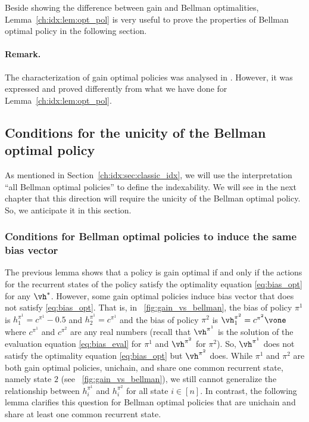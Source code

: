 Beside showing the difference between gain and Bellman optimalities, Lemma~\ref{ch:idx:lem:opt_pol} is very useful to prove the properties of Bellman optimal policy in the following section.

\paragraph{Remark.} The characterization of gain optimal policies was analysed in \cite{puterman2014markov, schweitzer1978functional}.
However, it was expressed and proved differently from what we have done for Lemma~\ref{ch:idx:lem:opt_pol}.

\subsection{Conditions for the unicity of the Bellman optimal policy}
\label{ch:idx:ssec:unicity_bell}

As mentioned in Section~\ref{ch:idx:sec:classic_idx}, we will use the interpretation ``all Bellman optimal policies'' to define the indexability.
We will see in the next chapter that this direction will require the unicity of the Bellman optimal policy.
So, we anticipate it in this section.

\subsubsection{Conditions for Bellman optimal policies to induce the same bias vector}

The previous lemma shows that a policy is gain optimal if and only if the actions for the recurrent states of the policy satisfy the optimality equation \eqref{eq:bias_opt} for any $\vh^*$.
However, some gain optimal policies induce bias vector that does not satisfy \eqref{eq:bias_opt}.
That is, in \figurename~\ref{fig:gain_vs_bellman}, the bias of policy $\pi^1$ is $h^{\pi^1}_1=c^{\pi^1}-0.5$ and $h^{\pi^1}_2=c^{\pi^1}$ and the bias of policy $\pi^2$ is $\vh^{\pi^2}_1=c^{\pi^2}\vone$ where $c^{\pi^1}$ and $c^{\pi^2}$ are any real numbers (recall that $\vh^{\pi^1}$ is the solution of the evaluation equation \eqref{eq:bias_eval} for $\pi^1$ and $\vh^{\pi^2}$ for $\pi^2$).
So, $\vh^{\pi^1}$ does not satisfy the optimality equation \eqref{eq:bias_opt} but $\vh^{\pi^2}$ does.
While $\pi^1$ and $\pi^2$ are both gain optimal policies, unichain, and share one common recurrent state, namely state $2$ (see \figurename~\ref{fig:gain_vs_bellman}), we still cannot generalize the relationship between $h^{\pi^1}_i$ and $h^{\pi^2}_i$ for all state $i\in[n]$.
In contrast, the following lemma clarifies this question for Bellman optimal policies that are unichain and share at least one common recurrent state.

